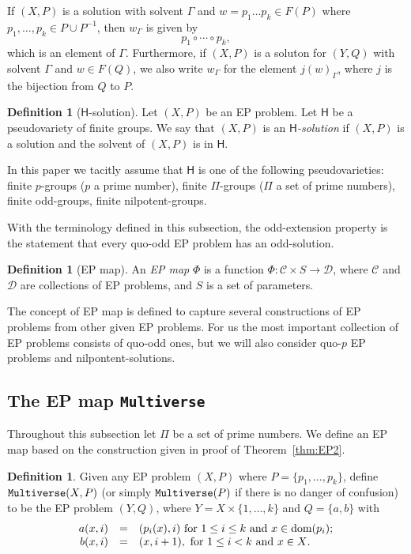 \documentclass[11pt]{amsart}
\theoremstyle{definition}
\newtheorem{definition}[theorem]{Definition}
\newcommand{\dom}{{\mbox{\rm dom}}}
\theoremstyle{definition}
\numberwithin{equation}{section}
\begin{document}
If $(X, P)$ is a solution with solvent $\Gamma$ and $w=p_1\dots p_k\in F(P)$ where $p_1, \dots, p_k\in P\cup P^{-1}$, then $w_\Gamma$ is given by 
$$ p_1\circ \cdots \circ p_k,$$
which is an element of $\Gamma$. Furthermore, if $(X, P)$ is a soluton for $(Y, Q)$ with solvent $\Gamma$ and $w\in F(Q)$, we also write $w_\Gamma$ for the element $j(w)_\Gamma$, where $j$ is the bijection from $Q$ to $P$.

\begin{definition}[$\mathsf{H}$-solution] Let $(X, P)$ be an EP problem. Let $\mathsf{H}$ be a pseudovariety of  finite groups.
We say that $(X, P)$ is an {\em $\mathsf{H}$-solution} if $(X, P)$ is a solution and the solvent of $(X, P)$ is in $\mathsf{H}$.
\end{definition}

In this paper we tacitly assume that $\mathsf{H}$ is one of the following pseudovarieties: 
finite $p$-groups ($p$ a prime number), finite $\Pi$-groups ($\Pi$ a set of prime numbers), finite odd-groups, finite nilpotent-groups.


With the terminology defined in this subsection, the odd-extension property is the statement that every quo-odd EP problem has an odd-solution.

\begin{definition}[EP map]\label{def:EPmap} An {\em EP map} $\Phi$ is a function $\Phi\colon \mathcal{C}\times S\to \mathcal{D}$, where $\mathcal{C}$ and $\mathcal{D}$ are collections of EP problems, and $S$ is a set of parameters.
\end{definition}

The concept of EP map is defined to capture several constructions of EP problems from other given EP problems. For us the most important collection of EP problems consists of quo-odd ones, but we will also consider quo-$p$ EP problems and nilpontent-solutions.




\subsection{The EP map {\tt Multiverse}}

Throughout this subsection let $\Pi$ be a set of prime numbers. We define an EP map based on the construction given in proof of Theorem~\ref{thm:EP2}. 


\begin{definition}\label{def:multiverse} Given any EP problem $(X, P)$ where $P=\{p_1,\dots, p_k\}$, define ${\tt Multiverse}(X, P)$ (or simply $\mbox{\tt Multiverse}(P)$ if there is no danger of confusion) to be the EP problem $(Y, Q)$, where $Y=X\times\{1,\dots, k\}$ and $Q=\{a, b\}$
with
$$ \begin{array}{rcl} a(x,i)&=& (p_i(x),i) \mbox{ for $1\leq i\leq k$ and $x\in\dom(p_i)$;} \\ 
b(x,i)&=& (x, i+1), \mbox{ for $1\leq i<k$ and $x\in X$.}
\end{array}
$$
\end{definition}
\end{document}
